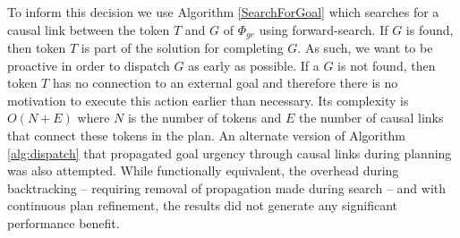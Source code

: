 To inform this decision we use Algorithm \ref{SearchForGoal} which
searches for a causal link between the token $T$ and $G$ of
$\Phi_{ge}$ using forward-search. If $G$ is found, then token $T$ is
part of the solution for completing $G$. As such, we want to be
proactive in order to dispatch $G$ as early as possible. If a $G$ is
not found, then token $T$ has no connection to an external goal and
therefore there is no motivation to execute this action earlier than
necessary. Its complexity is $O(N+E)$ \cite{corman} where $N$ is the
number of tokens and $E$ the number of causal links that connect these
tokens in the plan. An alternate version of Algorithm
\ref{alg:dispatch} that propagated goal urgency through causal links
during planning was also attempted. While functionally equivalent, the
overhead during backtracking -- requiring removal of propagation made
during search -- and with continuous plan refinement, the results did
not generate any significant performance benefit.



